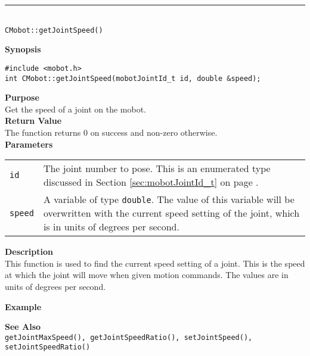 \noindent
\vspace{5pt}
\rule{4.5in}{0.015in}\\
\noindent
{\LARGE \texttt{CMobot::getJointSpeed()}}\\
{}

\noindent
{\bf Synopsis}
\vspace{-8pt}
\begin{verbatim}
#include <mobot.h>
int CMobot::getJointSpeed(mobotJointId_t id, double &speed);
\end{verbatim}

\noindent
{\bf Purpose}\\
Get the speed of a joint on the mobot.\\

\noindent
{\bf Return Value}\\
The function returns 0 on success and non-zero otherwise.\\

\noindent
{\bf Parameters}
\vspace{-0.1in}
\begin{description}
\item               
\begin{tabular}{p{10 mm}p{145 mm}}
\texttt{id} & The joint number to pose. This is an enumerated type 
discussed in Section \ref{sec:mobotJointId_t} on page
\pageref{sec:mobotJointId_t}.\\
\texttt{speed} & A variable of type \texttt{double}. The value of this variable
will be overwritten with the current speed setting of the joint, which is 
in units of degrees per second.
\end{tabular}
\end{description}

\noindent
{\bf Description}\\
This function is used to find the current speed setting of a joint.  This is
the speed at which the joint will move when given motion commands. The values
are in units of degrees per second.

\noindent
{\bf Example}\\
\noindent

\noindent
{\bf See Also}\\
\texttt{getJointMaxSpeed(), getJointSpeedRatio(), setJointSpeed(), setJointSpeedRatio()}

